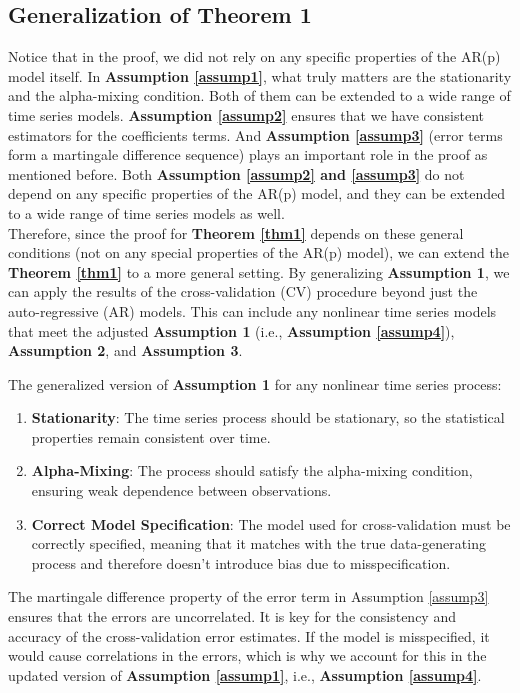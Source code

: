 \documentclass[12pt, oneside]{amsart}
\theoremstyle{definition}
\theoremstyle{remark}
\numberwithin{equation}{section}
\begin{document}
\subsection{Generalization of Theorem 1}
Notice that in the proof, we did not rely on any specific properties of the AR(p) model itself. In \textbf{Assumption \ref{assump1}}, what truly matters are the stationarity and the alpha-mixing condition. Both of them can be extended to a wide range of time series models. \textbf{Assumption \ref{assump2}} ensures that we have consistent estimators for the coefficients terms. And \textbf{Assumption \ref{assump3}} (error terms form a martingale difference sequence) plays an important role in the proof as mentioned before. Both \textbf{Assumption \ref{assump2} and \ref{assump3}} do not depend on any specific properties of the AR(p) model, and they can be extended to a wide range of time series models as well. \\

Therefore, since the proof for \textbf{Theorem \ref{thm1}} depends on these general conditions (not on any special properties of the AR(p) model), we can extend the \textbf{Theorem \ref{thm1}} to a more general setting. By generalizing \textbf{Assumption 1}, we can apply the results of the cross-validation (CV) procedure beyond just the auto-regressive (AR) models. This can include any nonlinear time series models that meet the adjusted \textbf{Assumption 1} (i.e., \textbf{Assumption \ref{assump4}}), \textbf{Assumption 2}, and \textbf{Assumption 3}. 

\begin{assumption}\label{assump4}
    The generalized version of \textbf{Assumption 1} for any nonlinear time series process:
\begin{enumerate}
    \item \textbf{Stationarity}: The time series process should be stationary, so the statistical properties remain consistent over time.
    \item \textbf{Alpha-Mixing}: The process should satisfy the alpha-mixing condition, ensuring weak dependence between observations.
    \item \textbf{Correct Model Specification}: The model used for cross-validation must be correctly specified, meaning that it matches with the true data-generating process and therefore doesn't introduce bias due to misspecification.
\end{enumerate}
\end{assumption}
The martingale difference property of the error term in Assumption \ref{assump3} ensures that the errors are uncorrelated. It is key for the consistency and accuracy of the cross-validation error estimates. If the model is misspecified, it would cause correlations in the errors, which is why we account for this in the updated version of \textbf{Assumption \ref{assump1}}, i.e., \textbf{Assumption \ref{assump4}}. \\
\end{document}
